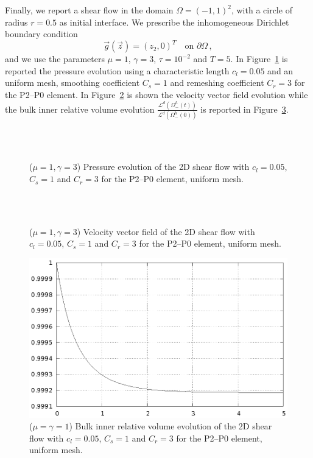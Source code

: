\documentclass[a4paper,12pt,onecolumn]{article}
\begin{document}
Finally, we report a shear flow in the domain $\Omega=(-1,1)^2$, with a circle of radius $r=0.5$ as initial interface. We prescribe the inhomogeneous Dirichlet boundary condition
\begin{equation*}
\vec g(\vec z)=(z_2,0)^T\quad \mbox{on }\partial\Omega\,,
\end{equation*}
and we use the parameters $\mu=1$, $\gamma=3$, $\tau=10^{-2}$ and $T=5$. In Figure~\ref{fig:shear_2d} is reported the pressure evolution using a characteristic length $c_l=0.05$ and an uniform mesh, smoothing coefficient $C_s=1$ and remeshing coefficient $C_r=3$ for the P2--P0 element. In Figure~\ref{fig:shear_2d_velocity} is shown the velocity vector field evolution while the bulk inner relative volume evolution $\frac{\mathcal{L}^d(\Omega^h_-(t))}{\mathcal{L}^d(\Omega^h_-(0))}$ is reported in Figure~\ref{fig:shear_2d_bulk_inner_volume}.
\begin{figure}[htbp]
  \centering
  \quad
  \\
  \quad
  \\
  \caption{($\mu=1,\gamma=3$) Pressure evolution of the 2D shear flow with $c_l=0.05$, $C_s=1$ and $C_r=3$ for the P2--P0 element, uniform mesh.}
  \label{fig:shear_2d}
\end{figure}

\begin{figure}[htbp]
  \centering
  \quad
  \\
  \quad
  \\
  \caption{($\mu=1,\gamma=3$) Velocity vector field of the 2D shear flow with $c_l=0.05$, $C_s=1$ and $C_r=3$ for the P2--P0 element, uniform mesh.}
  \label{fig:shear_2d_velocity}
\end{figure}

\begin{figure}[htbp]
  \centering
  \includegraphics[width=.45\textwidth]{figures/2d_shear_bulk_inner_volume.ps}
  \caption{($\mu=\gamma=1$) Bulk inner relative volume evolution of the 2D shear flow with $c_l=0.05$, $C_s=1$ and $C_r=3$ for the P2--P0 element, uniform mesh.}
  \label{fig:shear_2d_bulk_inner_volume}
\end{figure}
\end{document}
